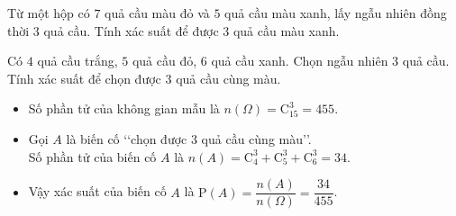 \begin{vd}
	Từ một hộp có $7$ quả cầu màu đỏ và $5$ quả cầu màu xanh, lấy ngẫu nhiên đồng thời $3$ quả cầu. Tính xác suất để được $3$ quả cầu màu xanh.
\end{vd}
\begin{vd}
	Có $4$ quả cầu trắng, $5$ quả cầu đỏ, $6$ quả cầu xanh. Chọn ngẫu nhiên $3$ quả cầu. Tính xác suất để chọn được $3$ quả cầu cùng màu.
	\loigiai
	{
		\begin{itemize}
			\item Số phần tử của không gian mẫu là $n(\Omega)=\mathrm{C}_{15}^3=455$.
			\item Gọi $A$ là biến cố \lq\lq  chọn được $3$ quả cầu cùng màu\rq\rq.\\
			Số phần tử của biến cố $A$ là $n(A)=\mathrm{C}_4^3+\mathrm{C}_5^3+\mathrm{C}_6^3=34$.
			\item Vậy xác suất của biến cố $A$ là $\mathrm{P}(A)=\dfrac{n(A)}{n(\Omega)}=\dfrac{34}{455}$.
		\end{itemize}
	}
\end{vd}

